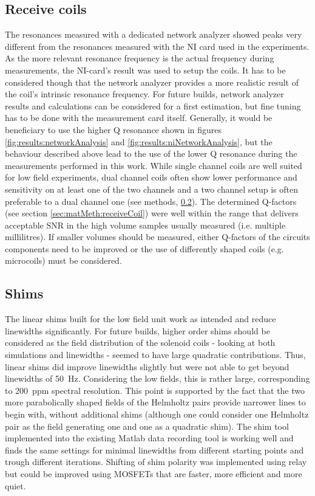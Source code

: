         \subsection{Receive coils}
            The resonances measured with a dedicated network analyzer showed peaks very different from the resonances measured with the NI card used in the experiments. As the more relevant resonance frequency is the actual frequency during measurements, the NI-card's result was used to setup the coils. It has to be considered though that the network analyzer provides a more realistic result of the coil's intrinsic resonance frequency. For future builds, network analyzer results and calculations can be considered for a first estimation, but fine tuning has to be done with the measurement card itself. Generally, it would be beneficiary to use the higher Q resonance shown in figures \ref{fig:results:networkAnalysis} and \ref{fig:results:niNetworkAnalysis}, but the behaviour described above lead to the use of the lower Q resonance during the measurements performed in this work.
            While single channel coils are well suited for low field experiments, dual channel coils often show lower performance and sensitivity on at least one of the two channels and a two channel setup is often preferable to a dual channel one (see methods, \ref{}). The determined Q-factors (see section \ref{sec:matMeth:receiveCoil}) were well within the range that delivers acceptable SNR in the high volume samples usually measured (i.e. multiple millilitres). If smaller volumes should be measured, either Q-factors of the circuits components need to be improved or the use of differently shaped coils (e.g. microcoils) must be considered.
        \subsection{Shims}
            The linear shims built for the low field unit work as intended and reduce linewidths significantly. For future builds, higher order shims should be considered as the field distribution of the solenoid coils - looking at both simulations and linewidths - seemed to have large quadratic contributions. Thus, linear shims did improve linewidths slightly but were not able to get beyond linewidths of \SI{50}{\hertz}. Considering the low fields, this is rather large, corresponding to 200~ppm spectral resolution. This point is supported by the fact that the two more parabolically shaped fields of the Helmholtz pairs provide narrower lines to begin with, without additional shims (although one could consider one Helmholtz pair as the field generating one and one as a quadratic shim). The shim tool implemented into the existing Matlab data recording tool is working well and finds the same settings for minimal linewidths from different starting points and trough different iterations. Shifting of shim polarity was implemented using relay but could be improved using MOSFETs that are faster, more efficient and more quiet.

